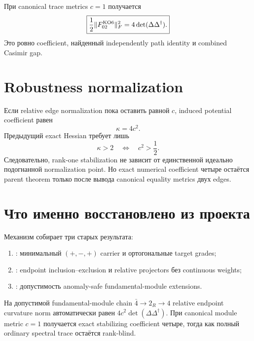 При canonical trace metrics \(c=1\) получается
\begin{equation}
 \boxed{\frac12\|F_{02}^{\rm KO6}\|_F^2
 =4\det(\Delta\Delta^\dagger).}
 \label{eq:ps-project-recovered-kappa-four}
\end{equation}
Это ровно coefficient, найденный independently path identity и combined
Casimir gap.

\section{Robustness normalization}

Если relative edge normalization пока оставить равной \(c\), induced
potential coefficient равен
\begin{equation}
 \kappa=4c^2.
\end{equation}
Предыдущий exact Hessian требует лишь
\begin{equation}
 \kappa>2
 \quad\Longleftrightarrow\quad
 c^2>\frac12.
 \label{eq:ps-project-recovery-window}
\end{equation}
Следовательно, rank-one stabilization не зависит от единственной идеально
подогнанной normalization point. Но exact numerical coefficient четыре
остаётся parent theorem только после вывода canonical equality metrics двух
edges.

\section{Что именно восстановлено из проекта}

Механизм собирает три старых результата:
\begin{enumerate}
 \item {}: минимальный
 \((+,-,+)\) carrier и ортогональные target grades;
 \item {}: endpoint
 inclusion--exclusion и relative projectors без continuous weights;
 \item {}: допустимость
 anomaly-safe fundamental-module extensions.
\end{enumerate}

\begin{proposition}
На допустимой fundamental-module chain \(\bar4\to2_R\to4\) relative endpoint
curvature norm автоматически равен
\(4c^2\det(\Delta\Delta^\dagger)\). При canonical module metric \(c=1\)
получается exact stabilizing coefficient четыре, тогда как полный ordinary
spectral trace остаётся rank-blind.
\end{proposition}

